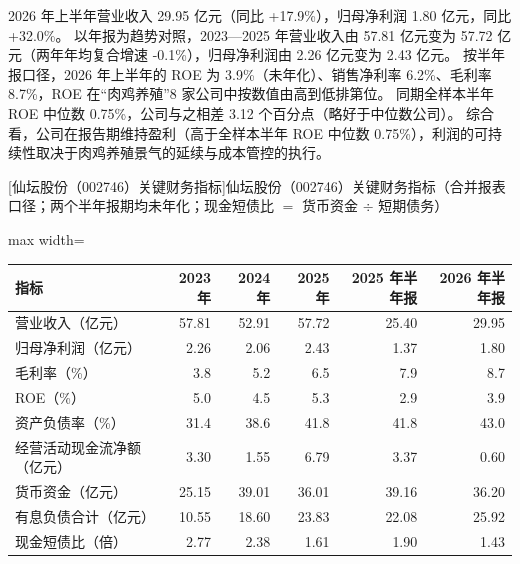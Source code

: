  2026 年上半年营业收入 29.95 亿元（同比 +17.9\%），归母净利润 1.80 亿元，同比 +32.0\%。 以年报为趋势对照，2023---2025 年营业收入由 57.81 亿元变为 57.72 亿元（两年年均复合增速 -0.1\%），归母净利润由 2.26 亿元变为 2.43 亿元。 按半年报口径，2026 年上半年的 ROE 为 3.9\%（未年化）、销售净利率 6.2\%、毛利率 8.7\%，ROE 在“肉鸡养殖”8 家公司中按数值由高到低排第位。 同期全样本半年 ROE 中位数 0.75\%，公司与之相差 3.12 个百分点（略好于中位数公司）。 综合看，公司在报告期维持盈利（高于全样本半年 ROE 中位数 0.75\%），利润的可持续性取决于肉鸡养殖景气的延续与成本管控的执行。

\begin{center}\small\setlength{\tabcolsep}{3.4pt}
[仙坛股份（002746）关键财务指标]{仙坛股份（002746）关键财务指标（合并报表口径；两个半年报期均未年化；现金短债比 $=$ 货币资金 $\div$ 短期债务）}
\begin{adjustbox}{max width=\textwidth}
\begin{tabular}{@{}lrrrrr@{}}
\toprule
指标 & 2023 年 & 2024 年 & 2025 年 & 2025 年半年报 & 2026 年半年报 \\
\midrule
营业收入（亿元） & 57.81 & 52.91 & 57.72 & 25.40 & 29.95 \\
归母净利润（亿元） & 2.26 & 2.06 & 2.43 & 1.37 & 1.80 \\
毛利率（\%） & 3.8 & 5.2 & 6.5 & 7.9 & 8.7 \\
ROE（\%） & 5.0 & 4.5 & 5.3 & 2.9 & 3.9 \\
资产负债率（\%） & 31.4 & 38.6 & 41.8 & 41.8 & 43.0 \\
经营活动现金流净额（亿元） & 3.30 & 1.55 & 6.79 & 3.37 & 0.60 \\
货币资金（亿元） & 25.15 & 39.01 & 36.01 & 39.16 & 36.20 \\
有息负债合计（亿元） & 10.55 & 18.60 & 23.83 & 22.08 & 25.92 \\
现金短债比（倍） & 2.77 & 2.38 & 1.61 & 1.90 & 1.43 \\
\bottomrule
\end{tabular}
\end{adjustbox}
\end{center}

